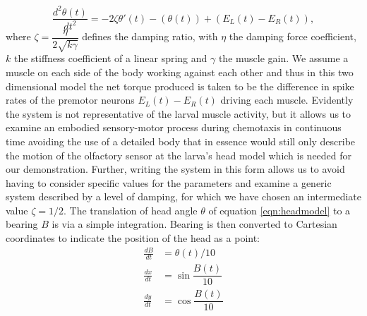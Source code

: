 \documentclass[10pt,a4paper]{article}
\begin{document}
\begin{equation}
\label{eqn:headmodel}
\frac{d^2\theta(t)}{dt^2} = - 2 \zeta \theta'(t) - (\theta(t)) + (E_L(t) - E_R(t)),
\end{equation}
where $\zeta= \dfrac{\eta}{ 2\sqrt{k \gamma}}$ defines the damping ratio, with $\eta$ the damping force coefficient, $k$ the stiffness coefficient of a linear spring and $\gamma$ the muscle gain.
We assume a muscle on each side of the body working against each other and thus in this two dimensional model the net torque produced is taken to be the difference in spike rates of the premotor neurons $E_L(t) - E_R(t)$ driving each muscle. 
Evidently the system is not representative of the larval muscle activity, but it allows us to examine an embodied sensory-motor process during chemotaxis in continuous time avoiding the use of a detailed body that in essence would still only describe the motion of the olfactory sensor at the larva's head model which is needed for our demonstration.
 Further, writing the system in this form allows us to avoid having to consider specific values for the parameters and examine a generic system described by a level of damping, for which we have chosen an intermediate value $\zeta=1/2$.
The translation of head angle $\theta$ of equation \ref{eqn:headmodel} to a bearing $B$ is via a simple integration. Bearing is then converted to Cartesian coordinates to indicate the position of the head as a point:
\begin{align}
\frac{dB}{dt} &= \theta(t)/10 \\
\frac{dx}{dt} &= \sin{\dfrac{B(t)}{10}} \\
\frac{dy}{dt} &= \cos{\dfrac{B(t)}{10}}
\end{align}
   
\end{document}
